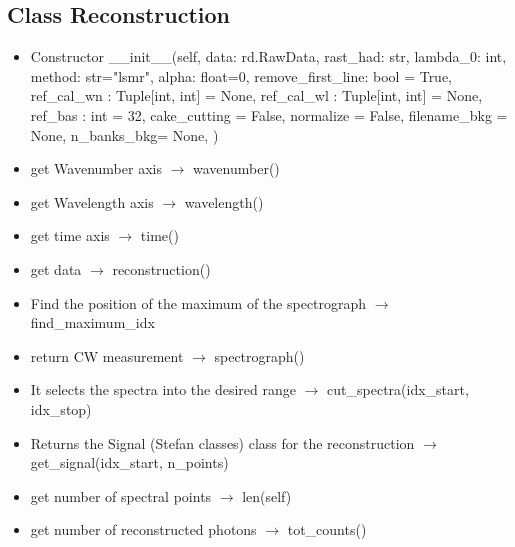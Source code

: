 \documentclass{article}
\begin{document}
\begin{multicols}{2}
\subsection{Class Reconstruction}
\begin{itemize}
\item Constructor \_\_init\_\_(self,
            data: rd.RawData,
            rast\_had: str,
            lambda\_0: int,
            method: str="lsmr",
            alpha: float=0,
            remove\_first\_line: bool = True,
            ref\_cal\_wn : Tuple[int, int] = None,
            ref\_cal\_wl : Tuple[int, int] = None,
            ref\_bas : int = 32,
            cake\_cutting = False,
            normalize = False,
            filename\_bkg = None,
            n\_banks\_bkg= None,
            )
\item get Wavenumber axis $\rightarrow$ wavenumber()
\item get Wavelength axis $\rightarrow$ wavelength()
\item get time axis $\rightarrow$ time()
\item get data $\rightarrow$ reconstruction()
\item Find the position of the maximum of the spectrograph $\rightarrow$ find\_maximum\_idx
\item return CW measurement $\rightarrow$ spectrograph()
\item It selects the spectra into the desired range $\rightarrow$ cut\_spectra(idx\_start, idx\_stop)
\item Returns the Signal (Stefan classes) class for the reconstruction $\rightarrow$  get\_signal(idx\_start, n\_points)
\item get number of spectral points $\rightarrow$ len(self)
\item get number of reconstructed photons $\rightarrow$ tot\_counts()
\end{itemize}


\end{multicols}
\end{document}
